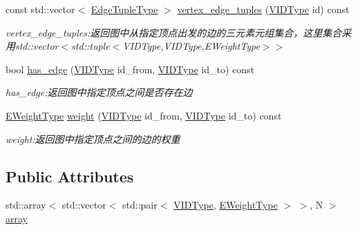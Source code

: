 \begin{DoxyCompactItemize}
const std\+::vector$<$ \hyperlink{struct_introduction_to_algorithm_1_1_graph_algorithm_1_1_a_d_j_list_graph_a6757574602df8359b10e37079c789eb6}{Edge\+Tuple\+Type} $>$ \hyperlink{struct_introduction_to_algorithm_1_1_graph_algorithm_1_1_a_d_j_list_graph_a8d4f953211df8bd5d3fffe6e362a7fa3}{vertex\+\_\+edge\+\_\+tuples} (\hyperlink{struct_introduction_to_algorithm_1_1_graph_algorithm_1_1_a_d_j_list_graph_aa42303d15a6a0e4cf6fad5c1327c1d79}{V\+I\+D\+Type} id) const 
\begin{DoxyCompactList}\small\item\em vertex\+\_\+edge\+\_\+tuples\+:返回图中从指定顶点出发的边的三元素元组集合，这里集合采用{\ttfamily std\+::vector$<$std\+::tuple$<$V\+I\+D\+Type,V\+I\+D\+Type,E\+Weight\+Type$>$$>$} \end{DoxyCompactList}\item 
bool \hyperlink{struct_introduction_to_algorithm_1_1_graph_algorithm_1_1_a_d_j_list_graph_aa0fd43a6621de69396f907e11cff5db4}{has\+\_\+edge} (\hyperlink{struct_introduction_to_algorithm_1_1_graph_algorithm_1_1_a_d_j_list_graph_aa42303d15a6a0e4cf6fad5c1327c1d79}{V\+I\+D\+Type} id\+\_\+from, \hyperlink{struct_introduction_to_algorithm_1_1_graph_algorithm_1_1_a_d_j_list_graph_aa42303d15a6a0e4cf6fad5c1327c1d79}{V\+I\+D\+Type} id\+\_\+to) const 
\begin{DoxyCompactList}\small\item\em has\+\_\+edge\+:返回图中指定顶点之间是否存在边 \end{DoxyCompactList}\item 
\hyperlink{struct_introduction_to_algorithm_1_1_graph_algorithm_1_1_a_d_j_list_graph_a8b9518587536b482cfd8c2fc7f5c9678}{E\+Weight\+Type} \hyperlink{struct_introduction_to_algorithm_1_1_graph_algorithm_1_1_a_d_j_list_graph_a8279dc0ecc39324c1f0e38a3c0a2ef03}{weight} (\hyperlink{struct_introduction_to_algorithm_1_1_graph_algorithm_1_1_a_d_j_list_graph_aa42303d15a6a0e4cf6fad5c1327c1d79}{V\+I\+D\+Type} id\+\_\+from, \hyperlink{struct_introduction_to_algorithm_1_1_graph_algorithm_1_1_a_d_j_list_graph_aa42303d15a6a0e4cf6fad5c1327c1d79}{V\+I\+D\+Type} id\+\_\+to) const 
\begin{DoxyCompactList}\small\item\em weight\+:返回图中指定顶点之间的边的权重 \end{DoxyCompactList}\end{DoxyCompactItemize}
\subsection*{Public Attributes}
\begin{DoxyCompactItemize}
\item 
std\+::array$<$ std\+::vector$<$ std\+::pair$<$ \hyperlink{struct_introduction_to_algorithm_1_1_graph_algorithm_1_1_a_d_j_list_graph_aa42303d15a6a0e4cf6fad5c1327c1d79}{V\+I\+D\+Type}, \hyperlink{struct_introduction_to_algorithm_1_1_graph_algorithm_1_1_a_d_j_list_graph_a8b9518587536b482cfd8c2fc7f5c9678}{E\+Weight\+Type} $>$ $>$, N $>$ \hyperlink{struct_introduction_to_algorithm_1_1_graph_algorithm_1_1_a_d_j_list_graph_ac02abc1501b57a7963ec1b388150429e}{array}
\end{DoxyCompactItemize}


